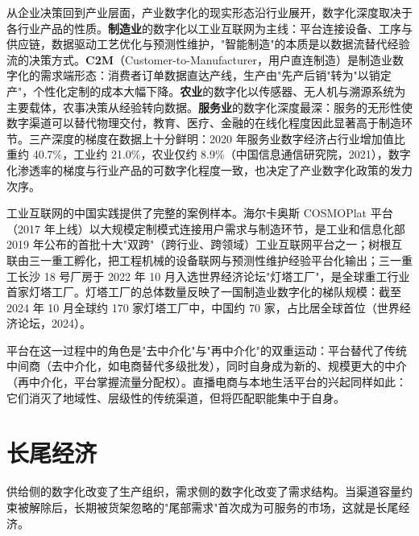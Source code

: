 从企业决策回到产业层面，产业数字化的现实形态沿行业展开，数字化深度取决于各行业产品的性质。\textbf{制造业}的数字化以工业互联网为主线：平台连接设备、工序与供应链，数据驱动工艺优化与预测性维护，"智能制造"的本质是以数据流替代经验流的决策方式。\textbf{C2M}（Customer-to-Manufacturer，用户直连制造）是制造业数字化的需求端形态：消费者订单数据直达产线，生产由"先产后销"转为"以销定产"，个性化定制的成本大幅下降。\textbf{农业}的数字化以传感器、无人机与溯源系统为主要载体，农事决策从经验转向数据。\textbf{服务业}的数字化深度最深：服务的无形性使数字渠道可以替代物理交付，教育、医疗、金融的在线化程度因此显著高于制造环节。三产深度的梯度在数据上十分鲜明：2020 年服务业数字经济占行业增加值比重约 40.7\%，工业约 21.0\%，农业仅约 8.9\%（中国信息通信研究院，2021），数字化渗透率的梯度与行业产品的可数字化程度一致，也决定了产业数字化政策的发力次序。

工业互联网的中国实践提供了完整的案例样本。海尔卡奥斯 COSMOPlat 平台（2017 年上线）以大规模定制模式连接用户需求与制造环节，是工业和信息化部 2019 年公布的首批十大"双跨"（跨行业、跨领域）工业互联网平台之一；树根互联由三一重工孵化，把工程机械的设备联网与预测性维护经验平台化输出；三一重工长沙 18 号厂房于 2022 年 10 月入选世界经济论坛"灯塔工厂"，是全球重工行业首家灯塔工厂。灯塔工厂的总体数量反映了一国制造业数字化的梯队规模：截至 2024 年 10 月全球约 170 家灯塔工厂中，中国约 70 家，占比居全球首位（世界经济论坛，2024）。

平台在这一过程中的角色是"去中介化"与"再中介化"的双重运动：平台替代了传统中间商（去中介化，如电商替代多级批发），同时自身成为新的、规模更大的中介（再中介化，平台掌握流量分配权）。直播电商与本地生活平台的兴起同样如此：它们消灭了地域性、层级性的传统渠道，但将匹配职能集中于自身。

\section{长尾经济}

供给侧的数字化改变了生产组织，需求侧的数字化改变了需求结构。当渠道容量约束被解除后，长期被货架忽略的"尾部需求"首次成为可服务的市场，这就是长尾经济。

